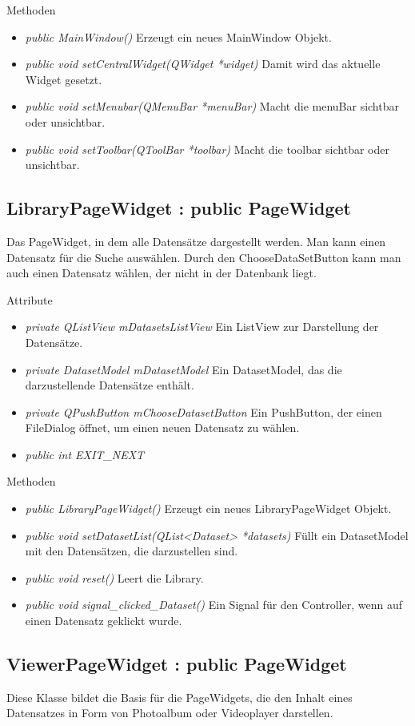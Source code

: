 Methoden
\begin{itemize}
	\item\textit{public MainWindow()} Erzeugt ein neues MainWindow Objekt.
	\item\textit{public void setCentralWidget(QWidget *widget)} Damit wird das aktuelle Widget gesetzt.
	\item\textit{public void setMenubar(QMenuBar *menuBar)} Macht die menuBar sichtbar oder unsichtbar.
	\item\textit{public void setToolbar(QToolBar *toolbar)} Macht die toolbar sichtbar oder unsichtbar.
\end{itemize}

\subsection*{LibraryPageWidget : public PageWidget}
Das PageWidget, in dem alle Datensätze dargestellt werden. Man kann einen Datensatz für die Suche auswählen. Durch den ChooseDataSetButton kann man auch einen Datensatz wählen, der nicht in der Datenbank liegt. 

Attribute
\begin{itemize}
	\item\textit{private QListView mDatasetsListView} Ein ListView zur Darstellung der Datensätze.
	\item\textit{private DatasetModel mDatasetModel}
	Ein DatasetModel, das die darzustellende Datensätze enthält.
	\item\textit{private QPushButton mChooseDatasetButton} Ein PushButton, der einen FileDialog öffnet, um einen neuen Datensatz zu wählen.
	\item\textit{public int EXIT\_NEXT}     
\end{itemize}

Methoden
\begin{itemize}
	\item\textit{public LibraryPageWidget()} Erzeugt ein neues LibraryPageWidget Objekt.
	\item\textit{public void setDatasetList(QList<Dataset> *datasets)} Füllt ein DatasetModel mit den Datensätzen, die darzustellen sind.
	\item\textit{public void reset()} Leert die Library.
	\item\textit{public void signal\_clicked\_Dataset()} Ein Signal für den Controller, wenn auf einen Datensatz geklickt wurde.
\end{itemize}

\subsection*{ViewerPageWidget : public PageWidget}
Diese Klasse bildet die Basis für die PageWidgets, die den Inhalt eines Datensatzes in Form von Photoalbum oder Videoplayer darstellen.

